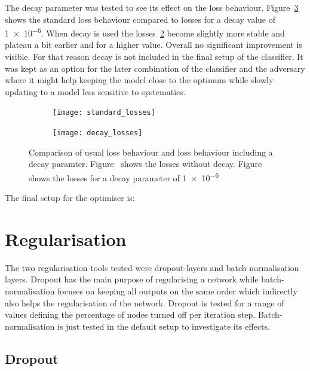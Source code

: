 The decay parameter was tested to see its effect on the loss behaviour. Figure~\ref{fig:decay} shows the standard loss behaviour compared to losses for a decay value of \num{1e-6}. When decay is used the losses~\ref{fig:decay:decay} become slightly more stable and plateau a bit earlier and for a higher value. Overall no significant improvement is visible. For that reason decay is not included in the final setup of the classifier. It was kept as an option for the later combination of the classifier and the adversary where it might help keeping the model close to the optimum while slowly updating to a model less sensitive to systematics.

\begin{figure}[htbp]
    \centering
    \begin{subfigure}[b]{0.45\textwidth}
        \texttt{[image: standard\_losses]}
        \caption{}
        \label{fig:decay:standard}
    \end{subfigure}
\quad
    \begin{subfigure}[b]{0.45\textwidth}
        \texttt{[image: decay\_losses]}
        \caption{}
        \label{fig:decay:decay}
    \end{subfigure}
    \caption{Comparison of usual loss behaviour and loss behaviour including a decay paramter. Figure~ shows the losses without decay. Figure~ shows the losses for a decay parameter of \num{1e-6}}
	\label{fig:decay}
\end{figure}

The final setup for the optimiser is:




\section{Regularisation}

The two regularisation tools tested were dropout-layers and batch-normalisation layers. Dropout has the main purpose of regularising a network while batch-normalisation focuses on keeping all outputs on the same order which indirectly also helps the regularisation of the network.
Dropout is tested for a range of values defining the percentage of nodes turned off per iteration step. Batch-normalisation is just tested in the default setup to investigate its effects.

\subsection{Dropout}
\label{sec:dropout}


